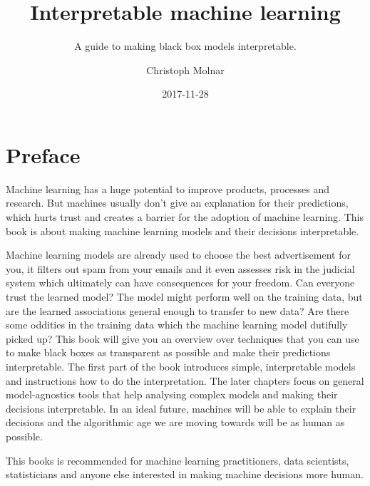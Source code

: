 \documentclass[12pt,]{krantz}
\title{Interpretable machine learning}
\subtitle{A guide to making black box models interpretable.}
\author{Christoph Molnar}
\date{2017-11-28}
\theoremstyle{definition}
\theoremstyle{definition}
\theoremstyle{definition}
\theoremstyle{remark}
\begin{document}
\maketitle



\setlength{\abovedisplayskip}{-5pt}
\setlength{\abovedisplayshortskip}{-5pt}

{
\hypersetup{linkcolor=black}
\setcounter{tocdepth}{1}
\tableofcontents
}
\chapter*{Preface}\label{preface}

Machine learning has a huge potential to improve products, processes and
research. But machines usually don't give an explanation for their
predictions, which hurts trust and creates a barrier for the adoption of
machine learning. This book is about making machine learning models and
their decisions interpretable.

Machine learning models are already used to choose the best
advertisement for you, it filters out spam from your emails and it even
assesses risk in the judicial system which ultimately can have
consequences for your freedom. Can everyone trust the learned model? The
model might perform well on the training data, but are the learned
associations general enough to transfer to new data? Are there some
oddities in the training data which the machine learning model dutifully
picked up? This book will give you an overview over techniques that you
can use to make black boxes as transparent as possible and make their
predictions interpretable. The first part of the book introduces simple,
interpretable models and instructions how to do the interpretation. The
later chapters focus on general model-agnostics tools that help
analysing complex models and making their decisions interpretable. In an
ideal future, machines will be able to explain their decisions and the
algorithmic age we are moving towards will be as human as possible.

This books is recommended for machine learning practitioners, data
scientists, statisticians and anyone else interested in making machine
decisions more human.
\end{document}
